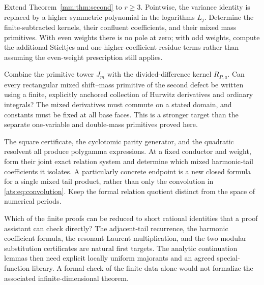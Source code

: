 \begin{question}
Extend Theorem~\ref{mm:thm:second} to $r\ge3$. Pointwise, the variance
identity is replaced by a higher symmetric polynomial in the logarithms
$L_j$. Determine the finite-subtracted kernels, their confluent
coefficients, and their mixed mass primitives. With even weights
there is no pole at zero; with odd weights, compute the additional
Stieltjes and one-higher-coefficient residue terms rather than assuming
the even-weight prescription still applies.
\end{question}

\begin{question}
Combine the primitive tower $J_m$ with the divided-difference kernel
$R_{P,a}$. Can every rectangular mixed shift--mass primitive of the
second defect be written using a finite, explicitly anchored collection
of Hurwitz derivatives and ordinary integrals? The mixed derivatives
must commute on a stated domain, and constants must be fixed at all
base faces. This is a stronger target than the separate one-variable
and double-mass primitives proved here.
\end{question}

\begin{question}
The square certificate, the cyclotomic parity generator, and the
quadratic resolvent all produce polygamma expressions. At a fixed
conductor and weight, form their joint exact relation system and
determine which mixed harmonic-tail coefficients it isolates. A
particularly concrete endpoint is a new closed formula for a single
mixed tail product, rather than only the convolution in
\eqref{ats:eq:convolution}. Keep the formal relation quotient distinct
from the space of numerical periods.
\end{question}

\begin{question}
Which of the finite proofs can be reduced to short rational identities
that a proof assistant can check directly? The adjacent-tail recurrence,
the harmonic coefficient formula, the resonant Laurent multiplication,
and the two modular substitution certificates are natural first
targets. The analytic continuation lemmas then need explicit locally
uniform majorants and an agreed special-function library. A formal
check of the finite data alone would not formalize the associated
infinite-dimensional theorem.
\end{question}

